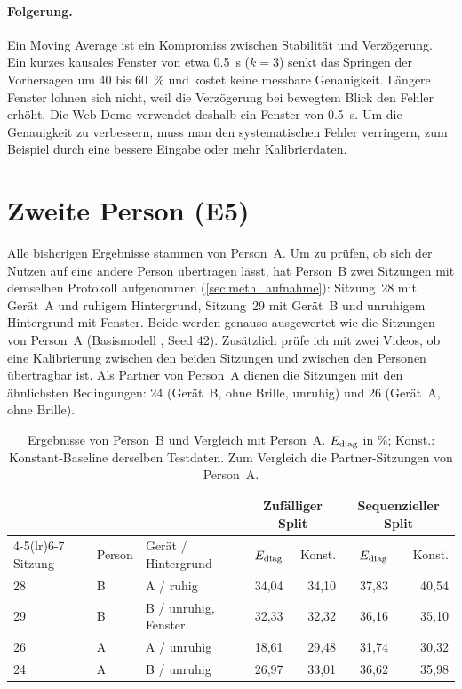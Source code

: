 \paragraph{Folgerung.} Ein Moving Average ist ein Kompromiss zwischen
Stabilität und Verzögerung. Ein kurzes kausales Fenster von etwa
\SI{0,5}{\second} ($k=3$) senkt das Springen der Vorhersagen um
\SI{40}{} bis \SI{60}{\percent} und kostet keine messbare Genauigkeit. Längere
Fenster lohnen sich nicht, weil die Verzögerung bei bewegtem Blick den Fehler
erhöht. Die Web-Demo verwendet deshalb ein Fenster von \SI{0,5}{\second}. Um die
Genauigkeit zu verbessern, muss man den systematischen Fehler verringern, zum
Beispiel durch eine bessere Eingabe oder mehr Kalibrierdaten.

\section{Zweite Person (E5)}
\label{sec:person_b}

Alle bisherigen Ergebnisse stammen von Person~A. Um zu prüfen, ob sich der
Nutzen auf eine andere Person übertragen lässt, hat Person~B zwei Sitzungen mit
demselben Protokoll aufgenommen (\cref{sec:meth_aufnahme}): Sitzung~28 mit
Gerät~A und ruhigem Hintergrund, Sitzung~29 mit Gerät~B und unruhigem
Hintergrund mit Fenster. Beide werden genauso ausgewertet wie die Sitzungen von
Person~A (Basismodell , Seed 42). Zusätzlich prüfe ich mit
zwei Videos, ob eine Kalibrierung zwischen den beiden Sitzungen und zwischen
den Personen übertragbar ist. Als Partner von Person~A dienen die Sitzungen mit
den ähnlichsten Bedingungen: 24 (Gerät~B, ohne Brille, unruhig) und 26
(Gerät~A, ohne Brille).

\begin{table}[htbp]
  \centering
  \caption[Ergebnisse der zweiten Person]{Ergebnisse von Person~B und Vergleich mit Person~A.
           $E_{\mathrm{diag}}$ in \si{\percent}; Konst.: Konstant-Baseline derselben
           Testdaten. Zum Vergleich die Partner-Sitzungen von Person~A.}
  \label{tab:person_b}
  \small
  \begin{tabular}{lll rr rr}
    \toprule
    & & & \multicolumn{2}{c}{Zufälliger Split} & \multicolumn{2}{c}{Sequenzieller Split} \\
    \cmidrule(lr){4-5}\cmidrule(lr){6-7}
    Sitzung & Person & Gerät / Hintergrund & $E_{\mathrm{diag}}$ & Konst. & $E_{\mathrm{diag}}$ & Konst. \\
    \midrule
    28 & B & A / ruhig            & 34,04 & 34,10 & 37,83 & 40,54 \\
    29 & B & B / unruhig, Fenster & 32,33 & 32,32 & 36,16 & 35,10 \\
    \midrule
    26 & A & A / unruhig          & 18,61 & 29,48 & 31,74 & 30,32 \\
    24 & A & B / unruhig          & 26,97 & 33,01 & 36,62 & 35,98 \\
    \bottomrule
  \end{tabular}
\end{table}

